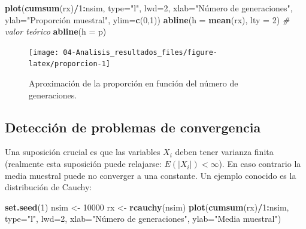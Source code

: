 \documentclass[
]{book}
\newenvironment{Shaded}{\begin{snugshade}}{\end{snugshade}}
\newcommand{\CommentTok}[1]{\textcolor[rgb]{0.56,0.35,0.01}{\textit{#1}}}
\newcommand{\DataTypeTok}[1]{\textcolor[rgb]{0.13,0.29,0.53}{#1}}
\newcommand{\DecValTok}[1]{\textcolor[rgb]{0.00,0.00,0.81}{#1}}
\newcommand{\KeywordTok}[1]{\textcolor[rgb]{0.13,0.29,0.53}{\textbf{#1}}}
\newcommand{\NormalTok}[1]{#1}
\newcommand{\OperatorTok}[1]{\textcolor[rgb]{0.81,0.36,0.00}{\textbf{#1}}}
\newcommand{\StringTok}[1]{\textcolor[rgb]{0.31,0.60,0.02}{#1}}
\theoremstyle{break}
\theoremstyle{definition}
\theoremstyle{definition}
\theoremstyle{definition}
\theoremstyle{remark}
\begin{document}
\begin{Shaded}
\begin{Highlighting}[]
\KeywordTok{plot}\NormalTok{(}\KeywordTok{cumsum}\NormalTok{(rx)}\OperatorTok{/}\DecValTok{1}\OperatorTok{:}\NormalTok{nsim, }\DataTypeTok{type=}\StringTok{"l"}\NormalTok{, }\DataTypeTok{lwd=}\DecValTok{2}\NormalTok{, }\DataTypeTok{xlab=}\StringTok{"Número de generaciones"}\NormalTok{, }
     \DataTypeTok{ylab=}\StringTok{"Proporción muestral"}\NormalTok{, }\DataTypeTok{ylim=}\KeywordTok{c}\NormalTok{(}\DecValTok{0}\NormalTok{,}\DecValTok{1}\NormalTok{))}
\KeywordTok{abline}\NormalTok{(}\DataTypeTok{h =} \KeywordTok{mean}\NormalTok{(rx), }\DataTypeTok{lty =} \DecValTok{2}\NormalTok{)}
\CommentTok{# valor teórico}
\KeywordTok{abline}\NormalTok{(}\DataTypeTok{h =}\NormalTok{ p) }
\end{Highlighting}
\end{Shaded}

\begin{figure}[!htb]

{\centering \texttt{[image: 04-Analisis\_resultados\_files/figure-latex/proporcion-1]} 

}

\caption{Aproximación de la proporción en función del número de generaciones.}\label{fig:proporcion}
\end{figure}

\hypertarget{detecciuxf3n-de-problemas-de-convergencia}{%
\subsection{Detección de problemas de convergencia}\label{detecciuxf3n-de-problemas-de-convergencia}}

Una suposición crucial es que las variables \(X_{i}\) deben tener
varianza finita (realmente esta suposición puede relajarse:
\(E\left( \left\vert X_{i} \right\vert \right) < \infty\)).
En caso contrario la media muestral puede no converger a
una constante. Un ejemplo conocido es la distribución de Cauchy:

\begin{Shaded}
\begin{Highlighting}[]
\KeywordTok{set.seed}\NormalTok{(}\DecValTok{1}\NormalTok{)}
\NormalTok{nsim <-}\StringTok{ }\DecValTok{10000}
\NormalTok{rx <-}\StringTok{ }\KeywordTok{rcauchy}\NormalTok{(nsim)}
\KeywordTok{plot}\NormalTok{(}\KeywordTok{cumsum}\NormalTok{(rx)}\OperatorTok{/}\DecValTok{1}\OperatorTok{:}\NormalTok{nsim, }\DataTypeTok{type=}\StringTok{"l"}\NormalTok{, }\DataTypeTok{lwd=}\DecValTok{2}\NormalTok{, }
     \DataTypeTok{xlab=}\StringTok{"Número de generaciones"}\NormalTok{, }\DataTypeTok{ylab=}\StringTok{"Media muestral"}\NormalTok{)}
\end{Highlighting}
\end{Shaded}
\end{document}
